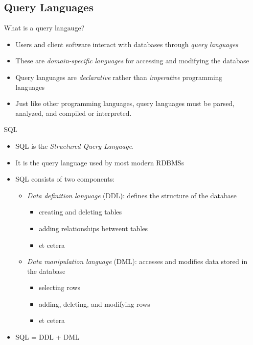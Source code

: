 \documentclass{beamer}
\begin{document}
\subsection{Query Languages}
\begin{frame}{What is a query langauge?}
  \begin{itemize}
  \item Users and client software interact with databases through {\it query languages}~\cite{silberschatz2010database,garcia2000database} \pause
  \item These are {\it domain-specific languages} for accessing and modifying the database \pause
  \item Query languages are {\it declarative} rather than {\it imperative} programming languages \pause
  \item Just like other programming languages, query languages must be parsed, analyzed, and compiled or interpreted.
  \end{itemize}
\end{frame}

\begin{frame}{SQL}
\begin{itemize}
  \item SQL is the {\it Structured Query Language}. \pause
  \item It is the query language used by most modern RDBMSs \pause
  \item SQL consists of two components: \pause
    \begin{itemize}
      \item {\it Data definition language} (DDL): defines the structure of the database 
      \begin{itemize}
        \item creating and deleting tables
        \item adding relationships betweent tables
        \item et cetera
        \end{itemize}\pause
      \item {\it Data manipulation language} (DML): accesses and modifies data stored in the database
      \begin{itemize}
        \item selecting rows
        \item adding, deleting, and modifying rows
        \item et cetera
      \end{itemize}
    \end{itemize} \pause
    \item SQL = DDL + DML
\end{itemize}
\end{frame}
\end{document}

